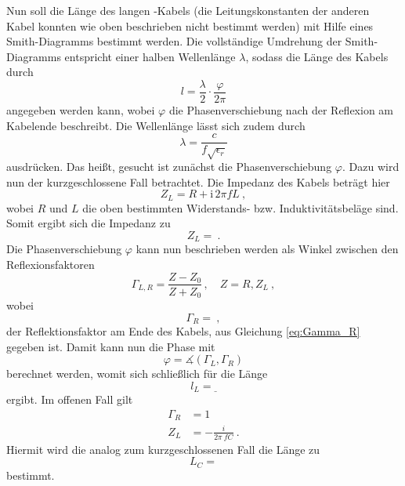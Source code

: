 Nun soll die Länge des langen \BU-Kabels (die Leitungskonstanten der anderen
Kabel konnten wie oben beschrieben nicht bestimmt werden) mit Hilfe eines
Smith-Diagramms bestimmt werden. Die vollständige Umdrehung der
Smith-Diagramms entspricht einer halben Wellenlänge $\lambda$, sodass die
Länge des Kabels durch
\begin{equation}
  l = \frac{\lambda}{2} \cdot \frac{\varphi}{2 \pi}
\end{equation}
angegeben werden kann, wobei $\varphi$ die Phasenverschiebung nach der Reflexion
am Kabelende beschreibt. Die Wellenlänge lässt sich zudem durch
\begin{equation}
  \lambda = \frac{c}{f \sqrt{\epsilon_r}}
\end{equation}
ausdrücken.
Das heißt, gesucht ist zunächst die Phasenverschiebung $\varphi$.
Dazu wird nun der kurzgeschlossene Fall betrachtet.
Die Impedanz des Kabels beträgt hier
\begin{equation}
  Z_L = R + \text{i}\, 2 \pi f L~,
\end{equation}
wobei $R$ und $L$ die oben bestimmten Widerstands- bzw. Induktivitätsbeläge
sind. Somit ergibt sich die Impedanz zu
\begin{equation}
  Z_L = ~.
\end{equation}
Die Phasenverschiebung $\varphi$ kann nun beschrieben werden als Winkel
zwischen den Reflexionsfaktoren
\begin{equation}
  \Gamma_{L,R} = \frac{Z - Z_0}{Z + Z_0}\,, \quad Z = R, Z_L~,
\end{equation}
wobei
\begin{equation}
  \Gamma_R = ~,
\end{equation}
der Reflektionsfaktor am Ende des Kabels,
aus Gleichung \eqref{eq:Gamma_R} gegeben ist.
Damit kann nun die Phase mit
\begin{equation}
  \varphi = \measuredangle(\Gamma_L, \Gamma_R)
\end{equation}
berechnet werden, womit sich schließlich für die Länge
\begin{equation}
  l_L = \underline{}
\end{equation}
ergibt.
Im offenen Fall gilt
\begin{align}
  \Gamma_R &= 1 \\
  Z_L &= - \frac{i}{2\pi\ fC}~.
\end{align}
Hiermit wird die analog zum kurzgeschlossenen Fall die Länge zu
\begin{equation}
  L_C = 
\end{equation}
bestimmt.

